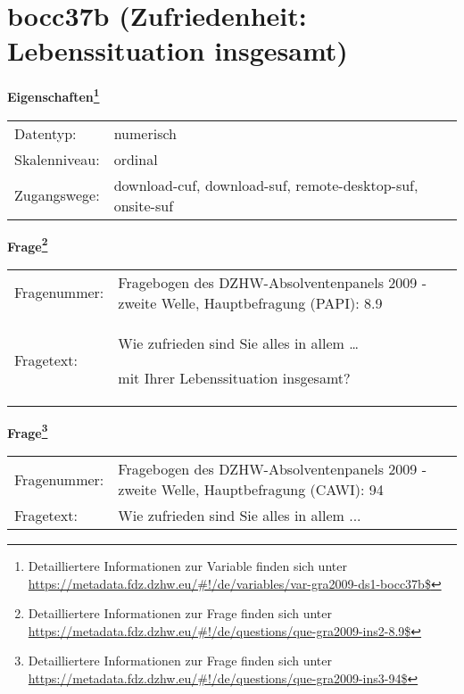 
    \setcounter{footnote}{0}

    \vspace*{-1.8cm}
	\section{bocc37b (Zufriedenheit: Lebenssituation insgesamt)}
	\label{section:bocc37b}



    \vspace*{0.5cm}
    \noindent\textbf{Eigenschaften\footnote{Detailliertere Informationen zur Variable finden sich unter
		\url{https://metadata.fdz.dzhw.eu/\#!/de/variables/var-gra2009-ds1-bocc37b$}}}\\
	\begin{tabularx}{\hsize}{@{}lX}
	Datentyp: & numerisch \\
	Skalenniveau: & ordinal \\
	Zugangswege: &
	  download-cuf, 
	  download-suf, 
	  remote-desktop-suf, 
	  onsite-suf
 \\
    \end{tabularx}



				\vspace*{0.5cm}
                \noindent\textbf{Frage\footnote{Detailliertere Informationen zur Frage finden sich unter
		              \url{https://metadata.fdz.dzhw.eu/\#!/de/questions/que-gra2009-ins2-8.9$}}}\\
				\begin{tabularx}{\hsize}{@{}lX}
					Fragenummer: &
					  Fragebogen des DZHW-Absolventenpanels 2009 - zweite Welle, Hauptbefragung (PAPI):
					  8.9
 \\
					Fragetext: & Wie zufrieden sind Sie alles in allem …\par  mit Ihrer Lebenssituation insgesamt? \\
				\end{tabularx}
				\vspace*{0.5cm}
                \noindent\textbf{Frage\footnote{Detailliertere Informationen zur Frage finden sich unter
		              \url{https://metadata.fdz.dzhw.eu/\#!/de/questions/que-gra2009-ins3-94$}}}\\
				\begin{tabularx}{\hsize}{@{}lX}
					Fragenummer: &
					  Fragebogen des DZHW-Absolventenpanels 2009 - zweite Welle, Hauptbefragung (CAWI):
					  94
 \\
					Fragetext: & Wie zufrieden sind Sie alles in allem ... \\
				\end{tabularx}





